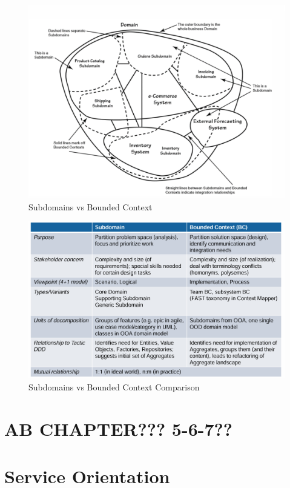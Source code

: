 \documentclass[../Main.tex]{subfiles}
\begin{document}
\begin{figure}[H]
    \centering
    \includegraphics[width=1\linewidth]{Images/subdomains-bounded-context.png}
    \caption{Subdomains vs Bounded Context}
\end{figure}

\begin{figure}[H]
    \centering
    \includegraphics[width=1\linewidth]{Images/subdomain-vs-bc.png}
    \caption{Subdomains vs Bounded Context Comparison}
\end{figure}

\section{AB CHAPTER??? 5-6-7??}

\section{Service Orientation}
\end{document}
